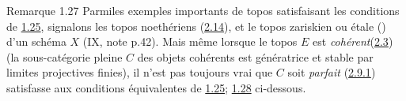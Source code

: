 \documentclass[10pt]{../fichiers-configuration-latex/smfart}
\begin{document}
\begin{enonce*}[remark]{Remarque 1.27}
Parmi\pageoriginale les exemples importants de topos satisfaisant les
conditions de \hyperref[VI.cor1.25]{1.25}, signalons les topos noethériens
(\hyperref[VI.subsec2.14]{2.14}), et le topos zariskien ou étale
() d'un schéma $X$ (\cf IX, note p.42). Mais
même lorsque
le topos $E$ est \emph{cohérent}(\hyperref[VI.def2.3]{2.3}) (\ie la sous-catégorie pleine
$C$ des objets cohérents est génératrice et stable par limites
projectives finies), il n'est pas toujours vrai que $C$ soit
\emph{parfait} (\hyperref[VI.def2.9.1]{2.9.1}) \ie satisfasse aux conditions équivalentes de
\hyperref[VI.cor1.25]{1.25}; \cf \hyperref[VI.exer1.28]{1.28} ci-dessous.
\end{enonce*}
\end{document}
